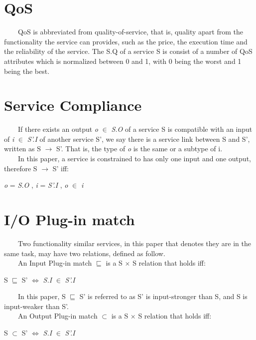 \documentclass[senior,final,11pt]{iscs-thesis}
\begin{document}
\section{QoS}
~~~~QoS is abbreviated from quality-of-service, that is, quality apart from the functionality the service can provides, such as the price, the execution time and the reliability of the service.
The S.Q of a service S is consist of a number of QoS attributes which is normalized between 0 and 1, with 0 being the worst and 1 being the best.

\section{Service Compliance}
~~~~If there exists an output {\em o} $\in$ {\em S.O} of a service S is compatible with an input of {\em i}  $\in$ {\em S'.I} of another service S', we say there is a service link between S and S', written as S $\to$ S'. That is, the type of {\em o} is the same or a subtype of i. \\
~~~~In this paper, a service is constrained to has only one input and one output, therefore S $\to$ S' iff:
\begin{center}
{\em o} = {\em S.O} ,  {\em i} = {\em S'.I} ,  {\em o} $\in$ {\em i}
\end{center}

\section{I/O Plug-in match}
~~~~Two functionality similar services, in this paper that denotes they are in the same task, may have two relations, defined as follow.\\
~~~~An Input Plug-in match $\sqsubseteq$ is a S $\times$ S relation that holds iff:
\begin{center}
S $\sqsubseteq$ S'  $\Leftrightarrow$ {\em S.I} $\in$ {\em S'.I}
\end{center}
~~~~In this paper, S $\sqsubseteq$ S' is referred to as S' is input-stronger than S, and S is input-weaker than S'.\\
~~~~An Output Plug-in match $\subset$ is a S $\times$ S relation that holds iff:
\begin{center}
S $\subset$ S' $\Leftrightarrow$ {\em S.I} $\in$ {\em S'.I}
\end{center}
\end{document}
